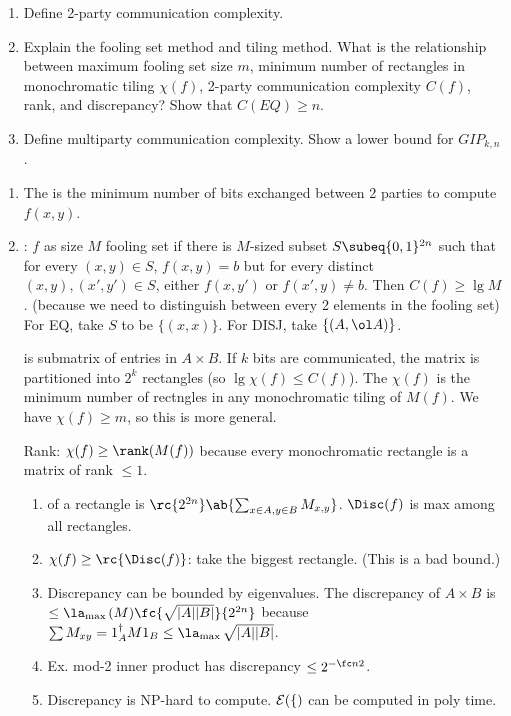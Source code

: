 \begin{enumerate}
\item
Define 2-party communication complexity.
\item 
Explain the fooling set method and tiling method. What is the relationship between maximum fooling set size $m$, minimum number of rectangles in monochromatic tiling $\chi(f)$, 2-party communication complexity $C(f)$, rank, and discrepancy? Show that $C(EQ)\ge n$.
\item Define multiparty communication complexity. Show a lower bound for $GIP_{k,n}$.
\end{enumerate}
\begin{enumerate}
\item
The  is the minimum number of bits exchanged between 2 parties to compute $f(x,y)$. 
\item
{}: $f$ as size $M$ fooling set if there is $M$-sized subset $S\subeq \{0,1\}^{2n}$ such that for every $(x,y)\in S$, $f(x,y)=b$ but for every distinct $(x,y),(x',y')\in S$, either $f(x,y')$ or $f(x',y)\ne b$. Then $C(f)\ge \lg M$. (because we need to distinguish between every 2 elements in the fooling set) For EQ, take $S$ to be $\{(x,x)\}$. For DISJ, take $\{(A,\ol A)\}$.

 is submatrix of entries in $A\times B$. If $k$ bits are communicated, the matrix is partitioned into $2^k$ rectangles (so $\lg \chi(f)\le C(f)$). The  $\chi(f)$ is the minimum number of rectngles in any monochromatic tiling of $M(f)$. We have $\chi(f)\ge m$, so this is more general.

Rank: $\chi(f)\ge \rank(M(f))$ because every monochromatic rectangle is a matrix of rank $\le 1$.

\begin{enumerate}
\item
{} of a rectangle is $\rc{2^{2n}}\ab{\sum_{x\in A,y\in B} M_{x,y}}$. $\Disc(f)$ is max among all rectangles. 
\item
$\chi(f)\ge\rc{\Disc(f)}$: take the biggest rectangle. (This is a bad bound.) 
\item Discrepancy can be bounded by eigenvalues. 
The discrepancy of $A\times B$ is $\le \la_{\max{}}(M)\fc{\sqrt{|A||B|}}{2^{2n}}$ because $\sum M_{xy}=1_A^{\dagger}M1_B\le \la_{\max{}}\sqrt{|A||B|}$. 
\item
Ex. mod-2 inner product has discrepancy $\le 2^{-\fc n2}$.
\item
Discrepancy is NP-hard to compute. $\cal E(f)$ can be computed in poly time.


\end{enumerate}
\end{enumerate}
